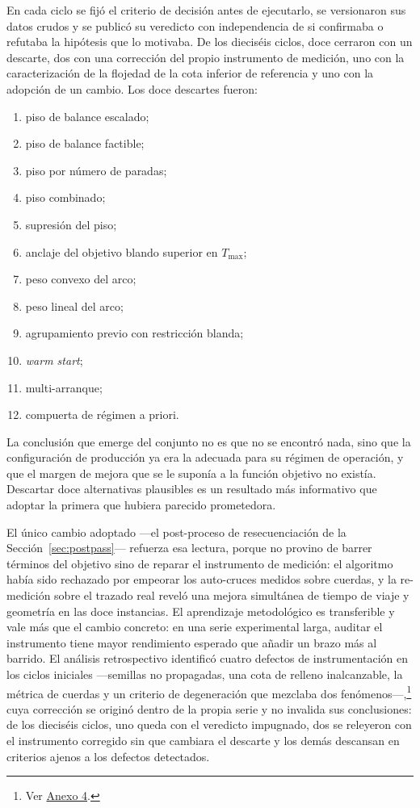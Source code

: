 En cada ciclo se fijó el criterio de decisión antes de ejecutarlo, se versionaron sus datos crudos y
se publicó su veredicto con independencia de si confirmaba o refutaba la hipótesis que lo motivaba.
De los dieciséis ciclos, doce cerraron con un descarte, dos con una corrección del propio
instrumento de medición, uno con la caracterización de la flojedad de la cota inferior de referencia
y uno con la adopción de un cambio. Los doce descartes fueron:
\begin{enumerate}[label=\alph*)]
  \item piso de balance escalado;
  \item piso de balance factible;
  \item piso por número de paradas;
  \item piso combinado;
  \item supresión del piso;
  \item anclaje del objetivo blando superior en $T_{\max}$;
  \item peso convexo del arco;
  \item peso lineal del arco;
  \item agrupamiento previo con restricción blanda;
  \item \textit{warm start};
  \item multi-arranque;
  \item compuerta de régimen a priori.
\end{enumerate}
La conclusión que emerge del conjunto no es que no se encontró nada, sino que la configuración de
producción ya era la adecuada para su régimen de operación, y que el margen de mejora que se le
suponía a la función objetivo no existía. Descartar doce alternativas plausibles es un resultado
más informativo que adoptar la primera que hubiera parecido prometedora.

El único cambio adoptado ---el post-proceso de resecuenciación de la Sección~\ref{sec:postpass}---
refuerza esa lectura, porque no provino de barrer términos del objetivo sino de reparar el
instrumento de medición: el algoritmo había sido rechazado por empeorar los auto-cruces medidos
sobre cuerdas, y la re-medición sobre el trazado real reveló una mejora simultánea de tiempo de
viaje y geometría en las doce instancias. El aprendizaje metodológico es transferible y vale más
que el cambio concreto: en una serie experimental larga, auditar el instrumento tiene mayor
rendimiento esperado que añadir un brazo más al barrido. El análisis retrospectivo identificó
cuatro defectos de instrumentación en los ciclos iniciales ---semillas no propagadas, una cota de
relleno inalcanzable, la métrica de cuerdas y un criterio de degeneración que mezclaba dos
fenómenos---,\footnote{Ver \hyperref[anx:auditoria-robustez]{Anexo 4}.} cuya corrección se originó
dentro de la propia serie y no invalida sus conclusiones: de los dieciséis ciclos, uno queda con el
veredicto impugnado, dos se releyeron con el instrumento corregido sin que cambiara el descarte y
los demás descansan en criterios ajenos a los defectos detectados.

